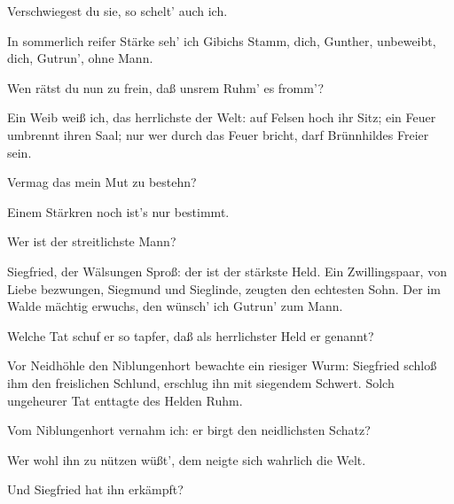 \begin{drama}
Verschwiegest du sie,
so schelt' auch ich.
 

\Hagenspeaks

In sommerlich reifer Stärke
seh' ich Gibichs Stamm,
dich, Gunther, unbeweibt,
dich, Gutrun', ohne Mann.
 




\Guntherspeaks

Wen rätst du nun zu frein,
daß unsrem Ruhm' es fromm'?
 

\Hagenspeaks

Ein Weib weiß ich,
das herrlichste der Welt:
auf Felsen hoch ihr Sitz;
ein Feuer umbrennt ihren Saal;
nur wer durch das Feuer bricht,
darf Brünnhildes Freier sein.
 

\Guntherspeaks

Vermag das mein Mut zu bestehn?
 

\Hagenspeaks

Einem Stärkren noch ist's nur bestimmt.
 

\Guntherspeaks

Wer ist der streitlichste Mann?
 

\Hagenspeaks

Siegfried, der Wälsungen Sproß:
der ist der stärkste Held.
Ein Zwillingspaar,
von Liebe bezwungen,
Siegmund und Sieglinde,
zeugten den echtesten Sohn.
Der im Walde mächtig erwuchs,
den wünsch' ich Gutrun' zum Mann.
 

\Gutrunespeaks



Welche Tat schuf er so tapfer,
daß als herrlichster Held er genannt?
 

\Hagenspeaks

Vor Neidhöhle den Niblungenhort
bewachte ein riesiger Wurm:
Siegfried schloß ihm den freislichen Schlund,
erschlug ihn mit siegendem Schwert.
Solch ungeheurer Tat
enttagte des Helden Ruhm.
 

\Guntherspeaks



Vom Niblungenhort vernahm ich:
er birgt den neidlichsten Schatz?
 

\Hagenspeaks

Wer wohl ihn zu nützen wüßt',
dem neigte sich wahrlich die Welt.
 

\Guntherspeaks

Und Siegfried hat ihn erkämpft?
 


\end{drama}
